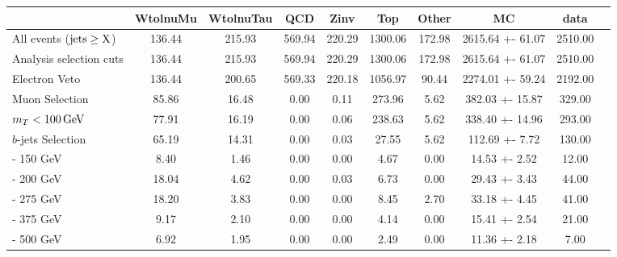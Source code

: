 \begin{table}[!htb]
\setlength{\tabcolsep}{2pt}
\small
\begin{center}

\begin{tabular}{lccccccccc} 
\hline\hline
& WtolnuMu& WtolnuTau& QCD& Zinv& Top& Other& MC& data \\ \hline \hline
 All events ($\rm jets\geq X$)& 136.44  & 215.93  & 569.94  & 220.29  & 1300.06  &  172.98  & 2615.64 +- 61.07 & 2510.00  \\
Analysis selection cuts& 136.44  & 215.93  & 569.94  & 220.29  & 1300.06   & 172.98  & 2615.64 +- 61.07 & 2510.00  \\
 Electron Veto & 136.44  & 200.65  & 569.33  & 220.18  & 1056.97   & 90.44  & 2274.01 +- 59.24 & 2192.00  \\
 Muon Selection & 85.86  & 16.48  & 0.00  & 0.11  & 273.96  & 5.62  & 382.03 +- 15.87 & 329.00  \\
 $m_T < 100\, \rm GeV$ & 77.91  & 16.19  & 0.00  & 0.06  & 238.63   & 5.62  & 338.40 +- 14.96 & 293.00  \\
 $b$-jets Selection & 65.19  & 14.31  & 0.00  & 0.03  & 27.55   & 5.62  & 112.69 +- 7.72 & 130.00  \\
 \mttwo  125 - 150 GeV & 8.40  & 1.46  & 0.00  & 0.00  & 4.67   & 0.00  & 14.53 +- 2.52 & 12.00  \\
 \mttwo  150 - 200 GeV & 18.04  & 4.62  & 0.00  & 0.03  & 6.73  & 0.00  & 29.43 +- 3.43 & 44.00  \\
 \mttwo  200 - 275 GeV & 18.20  & 3.83  & 0.00  & 0.00  & 8.45  & 2.70  & 33.18 +- 4.45 & 41.00  \\
 \mttwo  275 - 375 GeV & 9.17  & 2.10  & 0.00  & 0.00  & 4.14   & 0.00  & 15.41 +- 2.54 & 21.00  \\
 \mttwo  375 - 500 GeV & 6.92  & 1.95  & 0.00  & 0.00  & 2.49   & 0.00  & 11.36 +- 2.18 & 7.00  \\

\end{tabular}
\end{center}
\end{table}
